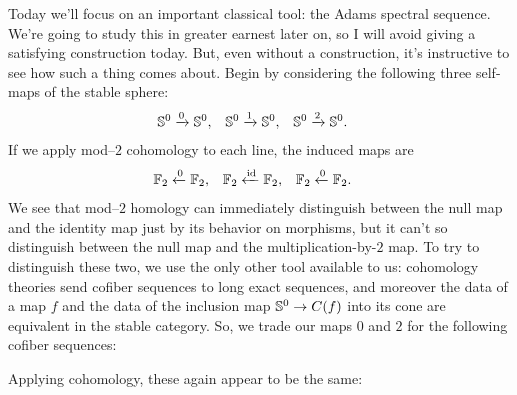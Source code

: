Today we'll focus on an important classical tool: the Adams spectral sequence.  We're going to study this in greater earnest later on, so I will avoid giving a satisfying construction today.  But, even without a construction, it's instructive to see how such a thing comes about.    Begin by considering the following three self-maps of the stable sphere:
\begin{align*}
\S^0 & \xrightarrow{0} \S^0, & \S^0 & \xrightarrow{1} \S^0, & \S^0 & \xrightarrow{2} \S^0.
\end{align*}
If we apply mod--$2$ cohomology to each line, the induced maps are
\begin{align*}
\F_2 & \xleftarrow{0} \F_2, & \F_2 & \xleftarrow{\id} \F_2, & \F_2 & \xleftarrow{0} \F_2.
\end{align*}
We see that mod--$2$ homology can immediately distinguish between the null map and the identity map just by its behavior on morphisms, but it can't so distinguish between the null map and the multiplication-by-$2$ map.  To try to distinguish these two, we use the only other tool available to us: cohomology theories send cofiber sequences to long exact sequences, and moreover the data of a map $f$ and the data of the inclusion map $\S^0 \to C(f)$ into its cone are equivalent in the stable category.  So, we trade our maps $0$ and $2$ for the following cofiber sequences:
\begin{center}
\end{center}
Applying cohomology, these again appear to be the same:
\begin{center}
\end{center}
